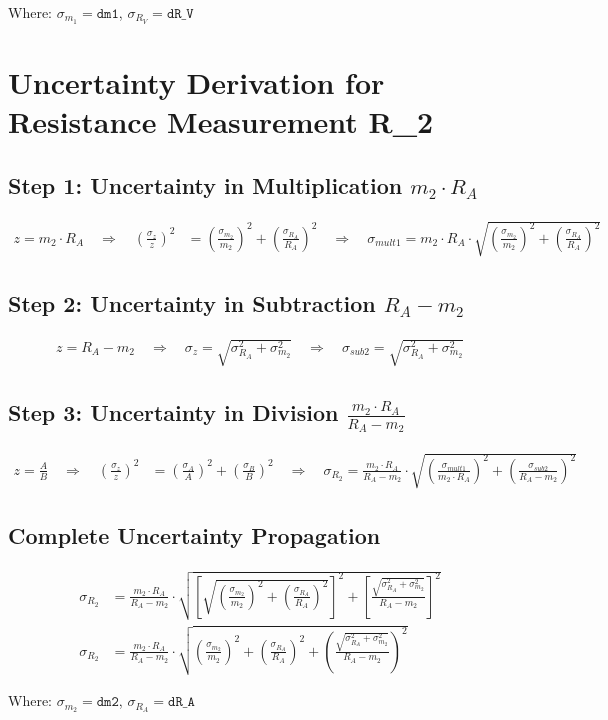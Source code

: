\documentclass{article} %
\begin{document}
Where: $\sigma_{m_1} = \texttt{dm1}$, $\sigma_{R_V} = \texttt{dR\_V}$

\newpage

\section{Uncertainty Derivation for Resistance Measurement R\_2}
\label{app:e_R2_uncertainty}

\subsection*{Step 1: Uncertainty in Multiplication $m_2 \cdot R_A$}
\begin{align*}
z = m_2 \cdot R_A \quad \Rightarrow \quad \left(\frac{\sigma_z}{z}\right)^2 &= \left(\frac{\sigma_{m_2}}{m_2}\right)^2 + \left(\frac{\sigma_{R_A}}{R_A}\right)^2 \quad \Rightarrow \quad \sigma_{mult1} = m_2 \cdot R_A \cdot \sqrt{\left(\frac{\sigma_{m_2}}{m_2}\right)^2 + \left(\frac{\sigma_{R_A}}{R_A}\right)^2}
\end{align*}

\subsection*{Step 2: Uncertainty in Subtraction $R_A - m_2$}
\begin{align*}
z = R_A - m_2 \quad \Rightarrow \quad \sigma_z = \sqrt{\sigma_{R_A}^2 + \sigma_{m_2}^2} \quad \Rightarrow \quad \sigma_{sub2} = \sqrt{\sigma_{R_A}^2 + \sigma_{m_2}^2}
\end{align*}

\subsection*{Step 3: Uncertainty in Division $\frac{m_2 \cdot R_A}{R_A - m_2}$}
\begin{align*}
z = \frac{A}{B} \quad \Rightarrow \quad \left(\frac{\sigma_z}{z}\right)^2 &= \left(\frac{\sigma_A}{A}\right)^2 + \left(\frac{\sigma_B}{B}\right)^2 \quad \Rightarrow \quad \sigma_{R_2} = \frac{m_2 \cdot R_A}{R_A - m_2} \cdot \sqrt{\left(\frac{\sigma_{mult1}}{m_2 \cdot R_A}\right)^2 + \left(\frac{\sigma_{sub2}}{R_A - m_2}\right)^2}
\end{align*}

\subsection*{Complete Uncertainty Propagation}
\begin{align*}
\sigma_{R_2} &= \frac{m_2 \cdot R_A}{R_A - m_2} \cdot \sqrt{\left[\sqrt{\left(\frac{\sigma_{m_2}}{m_2}\right)^2 + \left(\frac{\sigma_{R_A}}{R_A}\right)^2}\right]^2 + \left[\frac{\sqrt{\sigma_{R_A}^2 + \sigma_{m_2}^2}}{R_A - m_2}\right]^2} \\
\sigma_{R_2} &= \frac{m_2 \cdot R_A}{R_A - m_2} \cdot \sqrt{\left(\frac{\sigma_{m_2}}{m_2}\right)^2 + \left(\frac{\sigma_{R_A}}{R_A}\right)^2 + \left(\frac{\sqrt{\sigma_{R_A}^2 + \sigma_{m_2}^2}}{R_A - m_2}\right)^2}
\end{align*}

Where: $\sigma_{m_2} = \texttt{dm2}$, $\sigma_{R_A} = \texttt{dR\_A}$
\end{document}
